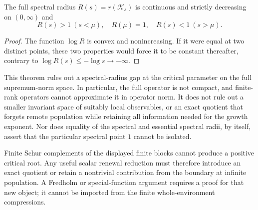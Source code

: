 \begin{corollary}\label{ess:characteristic}
The full spectral radius $R(s)=r(\mathcal K_s)$ is continuous and
strictly decreasing on $(0,\infty)$ and
\[
 R(s)>1\ (s<\mu),\quad R(\mu)=1,\quad R(s)<1\ (s>\mu).
\]
\end{corollary}
\begin{proof}
The function $\log R$ is convex and nonincreasing.  If it were equal
at two distinct points, these two properties would force it to be
constant thereafter, contrary to $\log R(s)\le-\log s\to-\infty$.
\end{proof}

This theorem rules out a spectral-radius gap at the critical parameter
on the full supremum-norm space.  In particular, the full operator is not compact, and finite-rank
operators cannot approximate it in operator norm.  It does not rule
out a smaller invariant space of suitably local observables, or an
exact quotient that forgets remote population while retaining all
information needed for the growth exponent.  Nor does equality of
the spectral and essential spectral radii, by itself, assert that the
particular spectral point $1$ cannot be isolated.

Finite Schur complements of the displayed finite blocks cannot produce
a positive critical root.  Any useful scalar renewal reduction must
therefore introduce an exact quotient or retain a nontrivial contribution
from the boundary at infinite population.  A Fredholm or special-function
argument requires a proof for that new object; it cannot be imported
from the finite whole-environment compressions.
